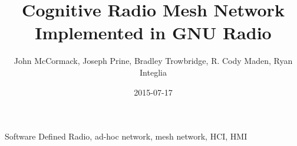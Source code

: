 \documentclass{IEEEtran}
\title{Cognitive Radio Mesh Network Implemented in GNU Radio}
\date{2015-07-17}
\author{John McCormack, Joseph Prine, Bradley Trowbridge, R. Cody Maden, Ryan Integlia}
\begin{document}
\maketitle

\begin{abstract}
	
\end{abstract}
\begin{IEEEkeywords}
Software Defined Radio, ad-hoc network, mesh network, HCI, HMI
\end{IEEEkeywords}











\end{document}
